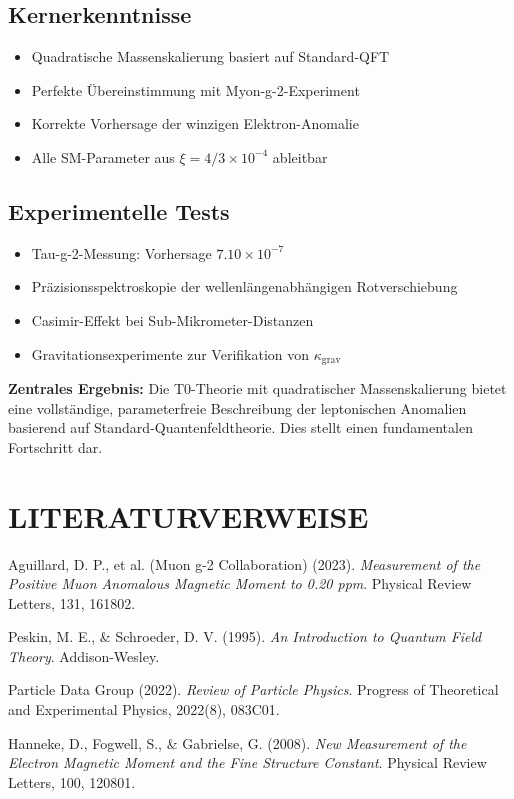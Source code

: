 \documentclass[12pt,a4paper]{article}
\begin{document}
	\subsection{Kernerkenntnisse}
	\begin{itemize}
		\item Quadratische Massenskalierung basiert auf Standard-QFT
		\item Perfekte Übereinstimmung mit Myon-g-2-Experiment
		\item Korrekte Vorhersage der winzigen Elektron-Anomalie
		\item Alle SM-Parameter aus $\xi = 4/3 \times 10^{-4}$ ableitbar
	\end{itemize}
	
	\subsection{Experimentelle Tests}
	\begin{itemize}
		\item Tau-g-2-Messung: Vorhersage $7.10 \times 10^{-7}$
		\item Präzisionsspektroskopie der wellenlängenabhängigen Rotverschiebung
		\item Casimir-Effekt bei Sub-Mikrometer-Distanzen
		\item Gravitationsexperimente zur Verifikation von $\kappa_{\text{grav}}$
	\end{itemize}
	
	\begin{important}
		\textbf{Zentrales Ergebnis:} Die T0-Theorie mit quadratischer Massenskalierung bietet eine vollständige, parameterfreie Beschreibung der leptonischen Anomalien basierend auf Standard-Quantenfeldtheorie. Dies stellt einen fundamentalen Fortschritt dar.
	\end{important}
	
	\section{LITERATURVERWEISE}
	
	\begin{thebibliography}{10}
		
		Aguillard, D. P., et al. (Muon g-2 Collaboration) (2023). 
		\textit{Measurement of the Positive Muon Anomalous Magnetic Moment to 0.20 ppm}. 
		Physical Review Letters, 131, 161802.
		
		Peskin, M. E., \& Schroeder, D. V. (1995). 
		\textit{An Introduction to Quantum Field Theory}. 
		Addison-Wesley.
		
		Particle Data Group (2022). 
		\textit{Review of Particle Physics}. 
		Progress of Theoretical and Experimental Physics, 2022(8), 083C01.
		
		Hanneke, D., Fogwell, S., \& Gabrielse, G. (2008). 
		\textit{New Measurement of the Electron Magnetic Moment and the Fine Structure Constant}. 
		Physical Review Letters, 100, 120801.
		
	\end{thebibliography}
	
\end{document}
